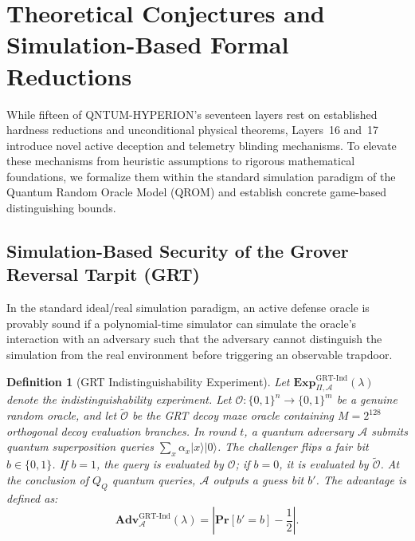\documentclass{ieeeaccess}
\renewcommand{\Pr}{\mathbf{Pr}}
\newcommand{\Adv}{\mathbf{Adv}}
\newcommand{\calA}{\mathcal{A}}
\newcommand{\calO}{\mathcal{O}}
\newtheorem{definition}{Definition}
\begin{document}
\section{Theoretical Conjectures and Simulation-Based Formal Reductions}
\label{sec:open}

While fifteen of \textsc{QNTUM-HYPERION}'s seventeen layers rest on established hardness reductions and unconditional physical theorems, Layers~16 and~17 introduce novel active deception and telemetry blinding mechanisms. To elevate these mechanisms from heuristic assumptions to rigorous mathematical foundations, we formalize them within the standard simulation paradigm of the Quantum Random Oracle Model (QROM) and establish concrete game-based distinguishing bounds.

\subsection{Simulation-Based Security of the Grover Reversal Tarpit (GRT)}
In the standard ideal/real simulation paradigm, an active defense oracle is provably sound if a polynomial-time simulator can simulate the oracle's interaction with an adversary such that the adversary cannot distinguish the simulation from the real environment before triggering an observable trapdoor.

\begin{definition}[GRT Indistinguishability Experiment]
Let $\mathbf{Exp}_{\Pi, \calA}^{\mathrm{GRT\text{-}Ind}}(\lambda)$ denote the indistinguishability experiment. Let $\calO: \{0,1\}^n \to \{0,1\}^m$ be a genuine random oracle, and let $\widetilde{\calO}$ be the GRT decoy maze oracle containing $M = 2^{128}$ orthogonal decoy evaluation branches. In round $t$, a quantum adversary $\calA$ submits quantum superposition queries $\sum_x \alpha_x |x\rangle |0\rangle$. The challenger flips a fair bit $b \in \{0,1\}$. If $b=1$, the query is evaluated by $\calO$; if $b=0$, it is evaluated by $\widetilde{\calO}$. At the conclusion of $Q_Q$ quantum queries, $\calA$ outputs a guess bit $b'$. The advantage is defined as:
\begin{equation}
  \Adv_{\calA}^{\mathrm{GRT\text{-}Ind}}(\lambda) = \left| \Pr[b' = b] - \frac{1}{2} \right|.
\end{equation}
\end{definition}
\end{document}
